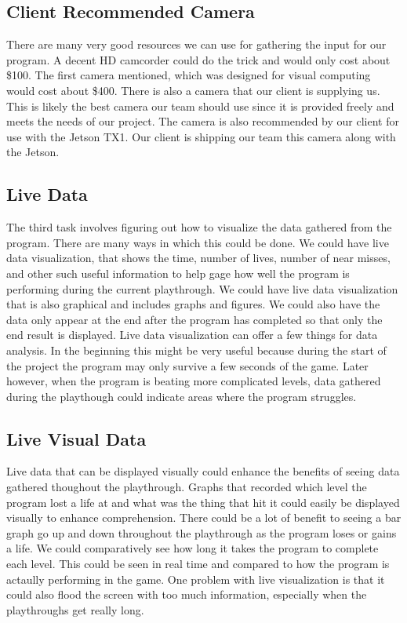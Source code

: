\documentclass{scrreprt}
\begin{document}
\subsection{Client Recommended Camera}
There are many very good resources we can use for gathering the input for our program.
A decent HD camcorder could do the trick and would only cost about \$100.
The first camera mentioned, which was designed for visual computing would cost about \$400.
There is also a camera that our client is supplying us.
This is likely the best camera our team should use since it is provided freely and meets the needs of our project.
The camera is also recommended by our client for use with the Jetson TX1.
Our client is shipping our team this camera along with the Jetson.

\subsection{Live Data}
The third task involves figuring out how to visualize the data gathered from the program.
There are many ways in which this could be done.
We could have live data visualization, that shows the time, number of lives, number of near misses, and other such useful information to help gage how well the program is performing during the current playthrough.
We could have live data visualization that is also graphical and includes graphs and figures.
We could also have the data only appear at the end after the program has completed so that only the end result is displayed.
Live data visualization can offer a few things for data analysis.
In the beginning this might be very useful because during the start of the project the program may only survive a few seconds of the game.
Later however, when the program is beating more complicated levels, data gathered during the playthough could indicate areas where the program struggles.

\subsection{Live Visual Data}
Live data that can be displayed visually could enhance the benefits of seeing data gathered thoughout the playthrough.
Graphs that recorded which level the program lost a life at and what was the thing that hit it could easily be displayed visually to enhance comprehension.
There could be a lot of benefit to seeing a bar graph go up and down throughout the playthrough as the program loses or gains a life.
We could comparatively see how long it takes the program to complete each level.
This could be seen in real time and compared to how the program is actaully performing in the game.
One problem with live visualization is that it could also flood the screen with too much information, especially when the playthroughs get really long.
\end{document}
